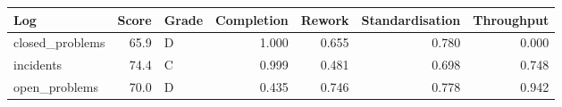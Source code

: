 \begin{tabular}{lrlrrrr}
\toprule
Log & Score & Grade & Completion & Rework & Standardisation & Throughput \\
\midrule
closed\_problems & 65.9 & D & 1.000 & 0.655 & 0.780 & 0.000 \\
incidents & 74.4 & C & 0.999 & 0.481 & 0.698 & 0.748 \\
open\_problems & 70.0 & D & 0.435 & 0.746 & 0.778 & 0.942 \\
\bottomrule
\end{tabular}
